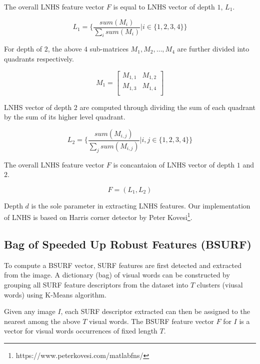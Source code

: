 The overall LNHS feature vector $F$ is equal to LNHS vector of depth $1$, $L_1$.

\begin{equation}
L_1 = \{\frac{sum(M_i)}{\sum_i sum(M_i)} | i \in \{1, 2, 3, 4\} \}
\end{equation}


For depth of $2$, the above $4$ sub-matrices $M_{1}, M_{2}, \dots, M_{4}$ are further divided into quadrants respectively.

\begin{equation}
M_{1} = 
\begin{bmatrix}
  M_{1,1}&  M_{1,2}\\
  M_{1,3}&  M_{1,4}\\
\end{bmatrix}
\end{equation}

LNHS vector of depth $2$ are computed through dividing the sum of each quadrant by the sum of its higher level quadrant.

\begin{equation}
L_2 = \{\frac{sum(M_{i,j})}{\sum_j sum(M_{i,j})} | i,j \in \{1, 2, 3, 4\}\}
\end{equation}

The overall LNHS feature vector $F$ is concantaion of LNHS vector of depth $1$ and $2$.

\begin{equation}
F = (L_1, L_2)
\end{equation}

Depth $d$ is the sole parameter in extracting LNHS features.
Our implementation of LNHS is based on Harris corner detector by Peter Kovesi\footnote{https://www.peterkovesi.com/matlabfns/}.

\subsection{Bag of Speeded Up Robust Features (BSURF)}
To compute a BSURF vector, SURF features \citep{bay2006surf} are first detected and extracted from the image.
A dictionary (bag) of visual words can be constructed by grouping all SURF feature descriptors from the dataset into $T$ clusters (viusal words) using K-Means algorithm.

Given any image $I$, each SURF descriptor extracted can then be assigned to the nearest among the above $T$ visual words.
The BSURF feature vector $F$ for $I$ is a vector for visual words occurrences of fixed length $T$.

